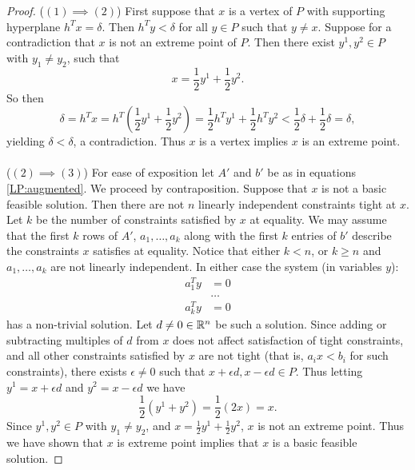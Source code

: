 \begin{proof}
($(1) \implies (2)$) First suppose that $x$ is a vertex of $P$ with supporting hyperplane $h^T x = \delta$. Then $h^Ty < \delta$ for all $y \in P$ such that $y \neq x$. Suppose for a contradiction that $x$ is not an extreme point of $P$. Then there exist $y^1, y^2 \in P$ with $y_1 \neq y_2$, such that $$ x = \frac{1}{2}y^1 + \frac{1}{2}y^2.$$ So then $$\delta = h^T x = h^T(\frac{1}{2} y^1 + \frac{1}{2} y^2) = \frac{1}{2}h^Ty^1 + \frac{1}{2} h^Ty^2 < \frac{1}{2}\delta +\frac{1}{2}\delta = \delta,$$ yielding $\delta < \delta$, a contradiction. Thus $x$ is a vertex implies $x$ is an extreme point.
\paragraph{}
($(2) \implies (3)$) For ease of exposition let $A'$ and $b'$ be as in equations \ref{LP:augmented}. We proceed by contraposition. Suppose that $x$ is not a basic feasible solution. Then there are not $n$ linearly independent constraints tight at $x$. Let $k$ be the number of constraints satisfied by $x$ at equality. We may assume that the first $k$ rows of $A'$, $a_1, \dots, a_k$ along with the first $k$ entries of $b'$ describe the constraints $x$ satisfies at equality. Notice that either $k<n$, or $k\geq n$ and $a_1, \dots, a_k$ are not linearly independent. In either case the system (in variables $y$):
\begin{align*}
a_1^T y &= 0 \\
&\dots \\
a_k^T y &= 0
\end{align*}
has a non-trivial solution. Let $d \neq 0 \in \mathbb{R}^n$ be such a solution. Since adding or subtracting multiples of $d$ from $x$ does not affect satisfaction of tight constraints, and all other constraints satisfied by $x$ are not tight (that is, $a_i x < b_i$ for such constraints), there exists $\epsilon \neq 0$ such that $x+ \epsilon d, x-\epsilon d \in P$. Thus letting $y^1 = x+ \epsilon d$ and $y^2 = x-\epsilon d$ we have
$$\frac{1}{2}(y^1 + y^2) = \frac{1}{2}(2x) = x.$$
Since $y^1, y^2 \in P$ with $y_1 \neq y_2$, and $x = \frac{1}{2}y^1 + \frac{1}{2}y^2$, $x$ is not an extreme point. Thus we have shown that $x$ is extreme point implies that $x$ is a basic feasible solution.

\end{proof}
